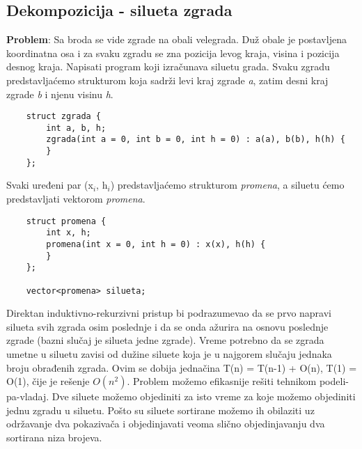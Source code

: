 \documentclass{article}
\begin{document}
\subsection{Dekompozicija - silueta zgrada}
\textbf{Problem}: Sa broda se vide zgrade na obali velegrada. Duž obale je postavljena
koordinatna osa i za svaku zgradu se zna pozicija levog kraja, visina i pozicija
desnog kraja. Napisati program koji izračunava siluetu grada.
\newline
Svaku zgradu predstavljaćemo strukturom koja sadrži levi kraj zgrade \textit{a}, zatim
desni kraj zgrade \textit{b} i njenu visinu \textit{h}.
\begin{lstlisting}
    struct zgrada {
        int a, b, h;
        zgrada(int a = 0, int b = 0, int h = 0) : a(a), b(b), h(h) {
        }
    };
\end{lstlisting}
Svaki uređeni par (x$_i$, h$_i$) predstavljaćemo strukturom \textit{promena}, a siluetu ćemo
predstavljati vektorom \textit{promena}.
\begin{lstlisting}
    struct promena {
        int x, h;
        promena(int x = 0, int h = 0) : x(x), h(h) {
        }
    };

    vector<promena> silueta;
\end{lstlisting}
Direktan induktivno-rekurzivni pristup bi podrazumevao da se prvo napravi
silueta svih zgrada osim poslednje i da se onda ažurira na osnovu poslednje
zgrade (bazni slučaj je silueta jedne zgrade). Vreme
potrebno da se zgrada umetne u siluetu zavisi od dužine siluete koja je u
najgorem slučaju jednaka broju obrađenih zgrada. Ovim se dobija jednačina
T(n) = T(n-1) + O(n), T(1) = O(1), čije je rešenje $O(n^2)$. Problem možemo efikasnije rešiti tehnikom podeli-pa-vladaj. Dve siluete možemo objediniti za isto vreme za koje možemo objediniti jednu
zgradu u siluetu. Pošto su siluete sortirane možemo ih obilaziti uz održavanje
dva pokazivača i objedinjavati veoma slično objedinjavanju dva sortirana niza
brojeva.
\end{document}
